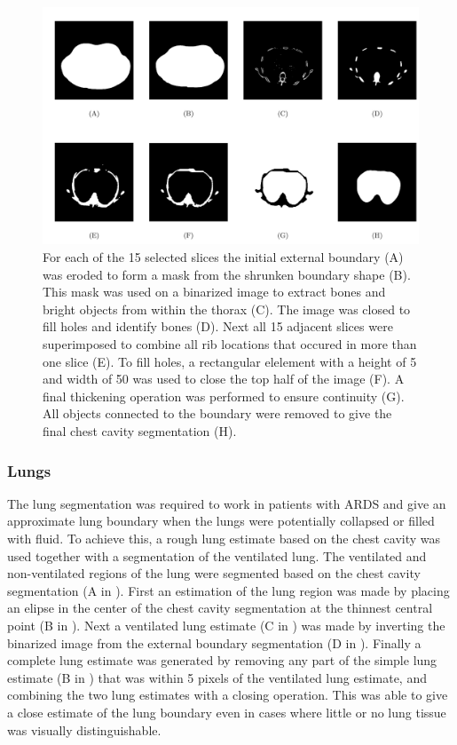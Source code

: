 \begin{figure}
	\centering
	\includegraphics[width=\textwidth]{chapter5-CT_to_mesh/imgs/chest_cavity_seg_methods.pdf}
	\caption[Chest cavity segmentation methods.]{\label{fig:cav_seg_methods}%
	For each of the 15 selected slices the initial external boundary (A)
	was eroded to form a mask from the shrunken boundary shape
	(B). This mask was used on a binarized image to extract bones and bright objects from
	within the thorax (C). The image was closed to fill  holes and identify bones
	(D). Next all 15 adjacent slices were superimposed to combine all rib locations
	that occured in more than one slice (E).
	To fill holes, a rectangular elelement with a height of 5 and width of 50 was used to close 
	the top half of the image (F).
	A final thickening operation was performed to ensure continuity
	(G). All objects connected to the boundary were removed 
	to give the final chest cavity segmentation (H).
	}
\end{figure}


\subsubsection{Lungs}
The lung segmentation was required to work in patients with ARDS and give 
an approximate lung boundary when the lungs were potentially collapsed or filled with 
fluid. To achieve this, a rough lung estimate based on the chest cavity  
was used together with a segmentation of the 
ventilated lung.
The ventilated and non-ventilated regions of the lung were segmented based 
on the chest cavity segmentation (A in ).
First an estimation of the lung region was made by placing an elipse
in the center of the chest cavity segmentation at the thinnest central
point (B in ). Next a ventilated lung estimate 
(C in )
was made
by inverting the binarized image from the external boundary segmentation
(D in ). 
Finally a complete lung estimate was generated by removing any part of the
simple lung estimate (B in ) that was within 5 
pixels of the ventilated lung estimate, and combining the two 
lung estimates with a closing operation. 
This was able to give a close estimate of the lung boundary even in cases where
little or no lung tissue was visually distinguishable. 

